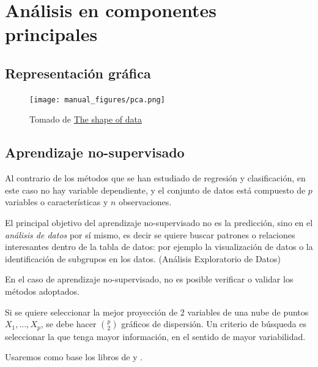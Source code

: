\documentclass[
  12pt,
]{book}
\newenvironment{Shaded}{\begin{snugshade}}{\end{snugshade}}
\newcommand{\AttributeTok}[1]{\textcolor[rgb]{0.77,0.63,0.00}{#1}}
\newcommand{\FunctionTok}[1]{\textcolor[rgb]{0.00,0.00,0.00}{#1}}
\newcommand{\NormalTok}[1]{#1}
\newcommand{\SpecialCharTok}[1]{\textcolor[rgb]{0.00,0.00,0.00}{#1}}
\newcommand{\StringTok}[1]{\textcolor[rgb]{0.31,0.60,0.02}{#1}}
\theoremstyle{definition}
\theoremstyle{definition}
\theoremstyle{definition}
\theoremstyle{definition}
\theoremstyle{remark}
\begin{document}
\hypertarget{anuxe1lisis-en-componentes-principales}{%
\chapter{Análisis en componentes principales}\label{anuxe1lisis-en-componentes-principales}}

\hypertarget{representaciuxf3n-gruxe1fica}{%
\section{Representación gráfica}\label{representaciuxf3n-gruxe1fica}}

\begin{figure}
\centering
\texttt{[image: manual\_figures/pca.png]}
\caption{Tomado de \href{https://shapeofdata.wordpress.com/2013/04/09/principle-component-analysis/}{The shape of data}}
\end{figure}

\hypertarget{aprendizaje-no-supervisado}{%
\section{Aprendizaje no-supervisado}\label{aprendizaje-no-supervisado}}

Al contrario de los métodos que se han estudiado de regresión y clasificación, en este caso no hay variable dependiente, y el conjunto de datos está compuesto de \(p\) variables o características y \(n\) observaciones.

El principal objetivo del aprendizaje no-supervisado no es la predicción, sino en el \emph{análisis de datos} por sí mismo, es decir se quiere buscar patrones o relaciones interesantes dentro de la tabla de datos: por ejemplo la visualización de datos o la identificación de subgrupos en los datos. (Análisis Exploratorio de Datos)

En el caso de aprendizaje no-supervisado, no es posible verificar o validar los métodos adoptados.

Si se quiere seleccionar la mejor proyección de 2 variables de una nube de puntos \(X_1,\dots, X_p\), se debe hacer \(\binom{p}{2}\) gráficos de dispersión. Un criterio de búsqueda es seleccionar la que tenga mayor información, en el sentido de mayor variabilidad.

Usaremos como base los libros de \autocite{HussonExploratory2017} y \autocite{James2013b}.

\begin{Shaded}
\end{Shaded}
\end{document}
